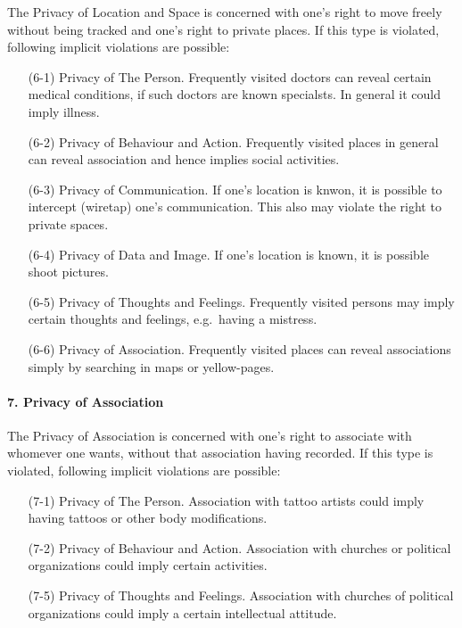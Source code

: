 The Privacy of Location and Space is concerned with one's right to move freely without being tracked and one's right to private places.
If this type is violated, following implicit violations are possible:

\begin{itemize}
\item [(6-1)] Privacy of The Person.
  Frequently visited doctors can reveal certain medical conditions, if such doctors are known specialsts.
  In general it could imply illness.
\item [(6-2)] Privacy of Behaviour and Action.
  Frequently visited places in general can reveal association and hence implies social activities.
\item [(6-3)] Privacy of Communication.
  If one's location is knwon, it is possible to intercept (wiretap) one's communication.
  This also may violate the right to private spaces.
\item [(6-4)] Privacy of Data and Image.
  If one's location is known, it is possible shoot pictures.
\item [(6-5)] Privacy of Thoughts and Feelings.
  Frequently visited persons may imply certain thoughts and feelings, e.g.~having a mistress.
\item [(6-6)] Privacy of Association.
  Frequently visited places can reveal associations simply by searching in maps or yellow-pages.
\end{itemize}

\paragraph*{7. Privacy of Association}

The Privacy of Association is concerned with one's right to associate with whomever one wants, without that association having recorded.
If this type is violated, following implicit violations are possible:

\begin{itemize}

\item [(7-1)] Privacy of The Person.
  Association with tattoo artists could imply having tattoos or other body modifications.
\item [(7-2)] Privacy of Behaviour and Action.
  Association with churches or political organizations could imply certain activities.
\item [(7-5)] Privacy of Thoughts and Feelings.
  Association with churches of political organizations could imply a certain intellectual attitude.
\end{itemize}

